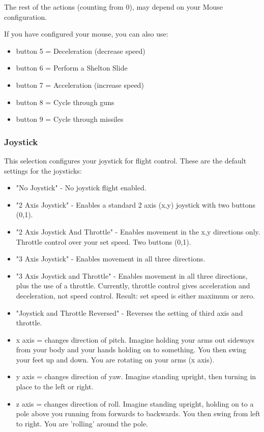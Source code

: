 \documentclass{article}
\begin{document}
The rest of the actions (counting from 0), may depend on your Mouse configuration.

If you have configured your mouse, you can also use:

\begin{itemize}
\item  button 5 = Deceleration (decrease speed) 
\item  button 6 = Perform a Shelton Slide 
\item  button 7 = Acceleration (increase speed) 
\item  button 8 = Cycle through guns 
\item  button 9 = Cycle through missiles 
\end{itemize}


\subsubsection{Joystick }

This selection configures your joystick for flight control. These are the default settings for the joysticks:



\begin{itemize}
\item  "No Joystick" - No joystick flight enabled. 
\item  "2 Axis Joystick" - Enables a standard 2 axis (x,y) joystick with two buttons (0,1). 
\item  "2 Axis Joystick And Throttle" - Enables movement in the x,y directions only. Throttle control over your set speed. Two buttons (0,1). 
\item  "3 Axis Joystick" - Enables movement in all three directions. 
\item  "3 Axis Joystick and Throttle" - Enables movement in all three directions, plus the use of a throttle. Currently, throttle control  gives acceleration and deceleration, not speed control. Result: set speed is either maximum or zero. 
\item  "Joystick and Throttle Reversed" - Reverses the setting of third axis and throttle. 
\end{itemize}


\begin{itemize}
\item  x axis = changes direction of pitch. Imagine holding your arms out sideways from your body and your hands holding on to something. You then swing your feet up and down. You are rotating on your arms (x axis). 

\item  y axis = changes direction of yaw. Imagine standing upright, then turning in place to the left or right.  

\item  z axis = changes direction of roll. Imagine standing upright, holding on to a pole above you running from forwards to backwards. You then swing from left to right. You are 'rolling' around the pole.
\end{itemize}
\end{document}
